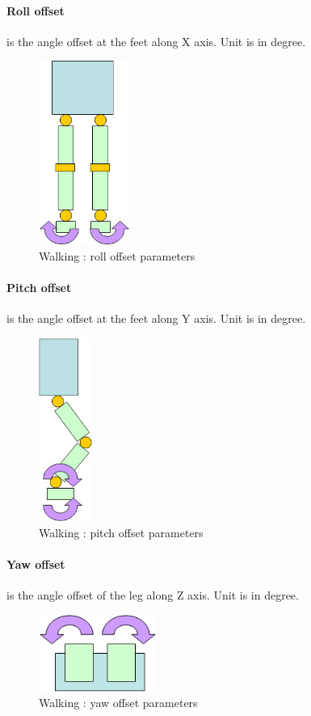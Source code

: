 \documentclass[a4paper, 12pt]{article}  		%
\begin{document}
\paragraph*{Roll offset}
is the angle offset at the feet along X axis. Unit is in degree.
\begin{figure}[H]
\begin{center}
\includegraphics[height=6cm]{roll_offset.jpg}
\caption{Walking : roll offset parameters}
\label{roll_offset}
\end{center}
\end{figure}

\newpage
\paragraph*{Pitch offset}
is the angle offset at the feet along Y axis. Unit is in degree.
\begin{figure}[H]
\begin{center}
\includegraphics[height=6cm]{pitch_offset.jpg}
\caption{Walking : pitch offset parameters}
\label{pitch_offset}
\end{center}
\end{figure}

\paragraph*{Yaw offset}
is the angle offset of the leg along Z axis. Unit is in degree.
\begin{figure}[H]
\begin{center}
\includegraphics[height=2.5cm]{yaw_offset.jpg}
\caption{Walking : yaw offset parameters}
\label{yaw_offset}
\end{center}
\end{figure}
\end{document}
